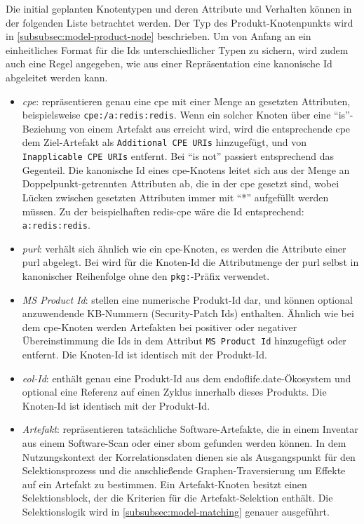 Die initial geplanten Knotentypen und deren Attribute und Verhalten können in der folgenden Liste betrachtet werden.
Der Typ des Produkt-Knotenpunkts wird in \autoref{subsubsec:model-product-node} beschrieben.
Um von Anfang an ein einheitliches Format für die Ids unterschiedlicher Typen zu sichern, wird zudem auch eine Regel angegeben, wie aus einer Repräsentation eine kanonische Id abgeleitet werden kann.

\begin{itemize}
    \itemsep0em
    \item \textit{\acrshort{cpe}}: repräsentieren genau eine \acrshort{cpe} mit einer Menge an gesetzten Attributen, beispielsweise \texttt{cpe:/a:redis:redis}.
    Wenn ein solcher Knoten über eine \enquote{is}-Beziehung von einem Artefakt aus erreicht wird, wird die entsprechende \acrshort{cpe} dem Ziel-Artefakt als \texttt{Additional CPE URIs} hinzugefügt, und von \texttt{Inapplicable CPE URIs} entfernt.
    Bei \enquote{is not} passiert entsprechend das Gegenteil.
    Die kanonische Id eines \acrshort{cpe}-Knotens leitet sich aus der Menge an Doppelpunkt-getrennten Attributen ab, die in der \acrshort{cpe} gesetzt sind, wobei Lücken zwischen gesetzten Attributen immer mit \enquote{*} aufgefüllt werden müssen.
    Zu der beispielhaften redis-\acrshort{cpe} wäre die Id entsprechend: \texttt{a:redis:redis}.
    \item \textit{\acrshort{purl}}: verhält sich ähnlich wie ein \acrshort{cpe}-Knoten, es werden die Attribute einer \acrshort{purl} abgelegt.
    Bei  wird für die Knoten-Id die Attributmenge der \acrshort{purl} selbst in kanonischer Reihenfolge ohne den \texttt{pkg:}-Präfix verwendet.
    \item \textit{MS Product Id}: stellen eine numerische Produkt-Id dar, und können optional anzuwendende KB-Nummern (Security-Patch Ids) enthalten.
    Ähnlich wie bei dem \acrshort{cpe}-Knoten werden Artefakten bei positiver oder negativer Übereinstimmung die Ids in dem Attribut \texttt{MS Product Id} hinzugefügt oder entfernt.
    Die Knoten-Id ist identisch mit der Produkt-Id.
    \item \textit{\acrshort{eol}-Id}: enthält genau eine Produkt-Id aus dem endoflife.date-Ökosystem und optional eine Referenz auf einen Zyklus innerhalb dieses Produkts.
    Die Knoten-Id ist identisch mit der Produkt-Id.
    \item \textit{Artefakt}: repräsentieren tatsächliche Software-Artefakte, die in einem Inventar aus einem Software-Scan oder einer \acrshort{sbom} gefunden werden können.
    In dem Nutzungskontext der Korrelationsdaten dienen sie als Ausgangspunkt für den Selektionsprozess und die anschließende Graphen-Traversierung um Effekte auf ein Artefakt zu bestimmen.
    Ein Artefakt-Knoten besitzt einen Selektionsblock, der die Kriterien für die Artefakt-Selektion enthält.
    Die Selektionslogik wird in \autoref{subsubsec:model-matching} genauer ausgeführt.
\end{itemize}


